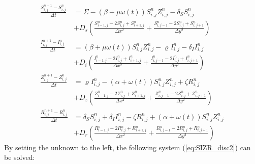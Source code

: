 \documentclass[%
twoside,                 %
final,                   %
chapterprefix=true,      %
open=right               %
10pt]{book}
\begin{document}
\begin{equation} \label{eq:SIZR_disc}
	\begin{aligned}
    \frac{S^{n+1}_{i,j}-S^n_{i,j}}{\Delta t} &= \Sigma - (\beta+\mu \omega(t))S^{n}_{i,j}Z^{n}_{i,j}- \delta_S S^{n}_{i,j} \\
        &+D_s\left(\frac{S^{n}_{i-1,j}-2S^{n}_{i,j}+S^{n}_{i+1,j}}{\Delta x^2}+\frac{S^{n}_{i,j-1}-2S^{n}_{i,j}+S^{n}_{i,j+1}}{\Delta y^2}\right) \\
    \frac{I^{n+1}_{i,j}-I^n_{i,j}}{\Delta t} &= (\beta+\mu \omega(t))S^{n}_{i,j}Z^{n}_{i,j}-\varrho I^{n}_{i,j}- \delta_I I^{n}_{i,j} \\
        &+D_i\left(\frac{I^{n}_{i-1,j}-2I^{n}_{i,j}+I^{n}_{i+1,j}}{\Delta x^2}+\frac{I^{n}_{i,j-1}-2I^{n}_{i,j}+I^{n}_{i,j+1}}{\Delta y^2}\right) \\
    \frac{Z^{n+1}_{i,j}-Z^n_{i,j}}{\Delta t} &= \varrho I^{n}_{i,j}-(\alpha+\omega(t))S^{n}_{i,j}Z^{n}_{i,j}+ \zeta R^{n}_{i,j} \\
        &+D_z\left(\frac{Z^{n}_{i-1,j}-2Z^{n}_{i,j}+Z^{n}_{i+1,j}}{\Delta x^2}+\frac{Z^{n}_{i,j-1}-2Z^{n}_{i,j}+Z^{n}_{i,j+1}}{\Delta y^2}\right) \\
    \frac{R^{n+1}_{i,j}-R^n_{i,j}}{\Delta t} &= \delta_S S^{n}_{i,j}+\delta_I I^{n}_{i,j}-\zeta R^{n}_{i,j}+(\alpha+\omega(t))S^{n}_{i,j}Z^{n}_{i,j} \\
        &+D_r\left(\frac{R^{n}_{i-1,j}-2R^{n}_{i,j}+R^{n}_{i+1,j}}{\Delta x^2}+\frac{R^{n}_{i,j-1}-2R^{n}_{i,j}+R^{n}_{i,j+1}}{\Delta y^2}\right) 
	\end{aligned}
\end{equation}
By setting the unknown to the left, the following system (\ref{eq:SIZR_disc2}) can be solved: 
\end{document}
